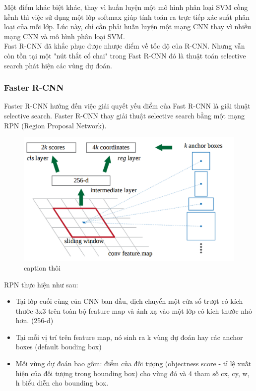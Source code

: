 \documentclass[a4paper]{report}
\begin{document}
Một điểm khác biệt khác, thay vì huấn luyện một mô hình phân loại SVM cồng kềnh thì 
việc sử dụng một lớp softmax giúp tính toán ra trực tiếp xác suất phân loại của mỗi lớp. 
Lúc này, chỉ cần phải huấn luyện một mạng CNN thay vì nhiều mạng CNN và mô hình phân loại 
SVM. \\

Fast R-CNN đã khắc phục được nhược điểm về tốc độ của R-CNN. Nhưng vẫn còn tồn tại một
 "nút thắt cổ chai" trong Fast R-CNN đó là thuật toán selective search phát hiện các 
 vùng dự đoán. 

\subsubsection{Faster R-CNN}
Faster R-CNN hướng đến việc giải quyết yếu điểm của Fast R-CNN là giải thuật selective
 search. Faster R-CNN thay giải thuật selective search bằng một mạng RPN (Region Proposal
 Network).\\

\begin{figure}
	\includegraphics[scale=0.45]{2_slide.png}
	\caption{caption thôi \cite{detectionoverview}}
\end{figure}

RPN thực hiện như sau:
\begin{itemize}
\item Tại lớp cuối cùng của CNN ban đầu, dịch chuyển một cửa sổ trượt có kích thước 3x3 
trên toàn bộ feature map và ánh xạ vào một lớp có kích thước nhỏ hơn. (256-d)
\item Tại mỗi vị trí trên feature map, nó sinh ra  k vùng dự đoán hay các anchor boxes (default bouding box)
\item Mỗi vùng dự đoán bao gồm: điểm của đối tượng (objectness score - tỉ lệ xuất hiện của đối tượng trong bounding box) cho vùng đó và 4 tham số cx, cy, w, h biểu diễn cho bounding box.
\end{itemize}
\end{document}
